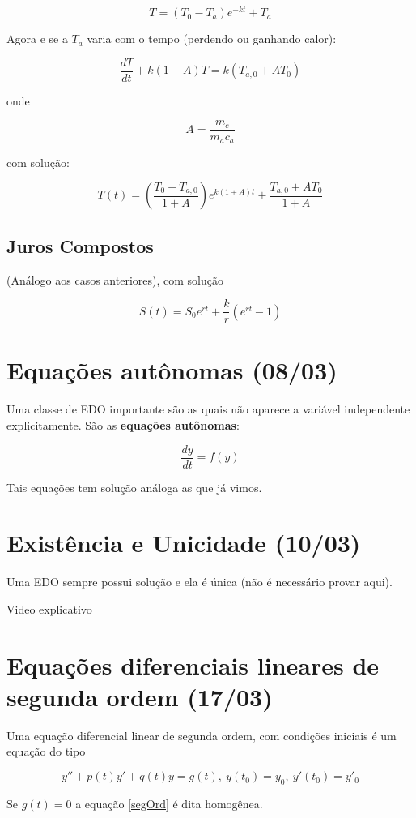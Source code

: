 \documentclass[12pt]{article}
\begin{document}
$$T = (T_0 - T_a) e^{-k t} + T_a$$

Agora e se a $T_a$ varia com o tempo (perdendo ou ganhando calor):

$$\dfrac{d T}{d t} + k (1 + A) T = k (T_{a,0} + A T_0)$$

onde

$$A = \dfrac{m_c}{m_a c_a}$$

com solução:

$$T(t) = \left ( \dfrac{T_0 - T_{a, 0}}{1 + A} \right ) e^{k (1 + A) t} + \dfrac{T_{a, 0} + A T_0}{1 + A}$$

\subsection*{Juros Compostos}
(Análogo aos casos anteriores), com solução

$$S(t) = S_0 e^{r t} + \dfrac{k}{r} (e^{r t} - 1)$$

\section{Equações autônomas (08/03)}
Uma classe de EDO importante são as quais não aparece a variável independente explicitamente. São as \textbf{equações autônomas}:

$$\dfrac{d y}{d t} = f(y)$$

Tais equações tem solução análoga as que já vimos.

\section{Existência e Unicidade (10/03)}
Uma EDO sempre possui solução e ela é única (não é necessário provar aqui).

\href{https://www.youtube.com/watch?v=01FK-H7Kbpk&t=1s}{Video explicativo}

\section{Equações diferenciais lineares de segunda ordem (17/03)}
Uma equação diferencial linear de segunda ordem, com condições iniciais é um equação do tipo

\begin{equation}\label{segOrd}
    y'' + p(t) y' + q(t)y = g(t), \ y(t_0) = y_0, \ y'(t_0) = y'_0
\end{equation}

Se $g(t) = 0$ a equação \ref{segOrd} é dita homogênea.
\end{document}
